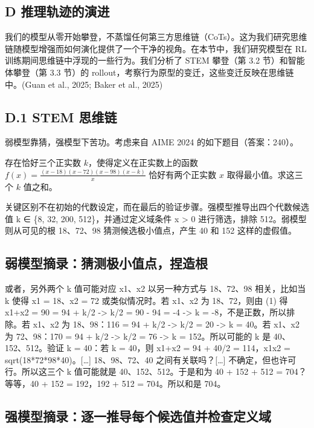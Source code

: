 \subsection{D 推理轨迹的演进}\label{d-evolution-of-reasoning-traces}

我们的模型从零开始攀登，不蒸馏任何第三方思维链（CoTs）。这为我们研究思维链随模型增强而如何演化提供了一个干净的视角。在本节中，我们研究模型在 RL 训练期间思维链中浮现的一些行为。我们分析了 STEM 攀登（第 3.2 节）和智能体攀登（第 3.3 节）的 rollout，考察行为原型的变迁，这些变迁反映在思维链中。(Guan et al., 2025; Baker et al., 2025)

\subsection{D.1 STEM 思维链}\label{d.1-stem-cots}

弱模型靠猜，强模型下苦功。考虑来自 AIME 2024 的如下题目（答案：240）。

存在恰好三个正实数 $k$，使得定义在正实数上的函数 $f(x)=\frac{(x-18)(x
-72)(x-98)(x-k)}{x}$ 恰好有两个正实数 $x$ 取得最小值。求这三个 $k$ 值之和。

关键区别不在初始的代数设定，而在最后的验证步骤。强模型推导出四个代数候选值 k ∈ \{8, 32, 200, 512\}，并通过定义域条件 x \textgreater{} 0 进行筛选，排除 512。弱模型则从可见的根 18、72、98 猜测候选极小值点，产生 40 和 152 这样的虚假值。

\subsection{弱模型摘录：猜测极小值点，捏造根}\label{weak-model-excerpt-guesses-the-minimizers-fabricating-roots}

或者，另外两个 k 值可能对应 x1、x2 以另一种方式与 18、72、98 相关，比如当 k 使得 x1 = 18、x2 = 72 或类似情况时。若 x1、x2 为 18、72，则由 (1) 得 x1+x2 = 90 = 94 + k/2 -> k/2 = 90 - 94 = -4 -> k = -8，不是正数，所以排除。若 x1、x2 为 18、98：116 = 94 + k/2 -> k/2 = 20 -> k = 40。若 x1、x2 为 72、98：170 = 94 + k/2 -> k/2 = 76 -> k = 152。所以可能的 k 是 40、152、512。验证 k = 40：若 k = 40，则 x1+x2 = 94 + 40/2 = 114，x1x2 = sqrt(18*72*98*40)。{[}\ldots{]} 18、98、72、40 之间有关联吗？{[}\ldots{]} 不确定，但也许可行。所以这三个 k 值可能就是 40、152、512。于是和为 40 + 152 + 512 = 704？等等，40 + 152 = 192，192 + 512 = 704。所以和是 704。

\subsection{强模型摘录：逐一推导每个候选值并检查定义域}\label{strong-model-excerpt-derives-each-candidate-and-checks-the-domain}


